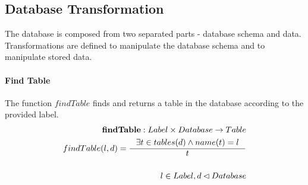 \documentclass[11pt]{article}
\begin{document}
\subsection{Database Transformation}
The database is composed from two separated parts - database schema and data. Transformations are defined to manipulate the database schema and to manipulate stored data. 

\paragraph{Find Table} The function $findTable$ finds and returns a table in the database according to the provided label.
\begin{align*}
	\mathbf{findTable} : Label \times Database \rightarrow Table  \\
	findTable(l, d) = \inference{\exists t \in tables(d) \wedge name(t) = l}{t}  \\ \\
	l \in Label, d \lhd Database
\end{align*}
\end{document}
